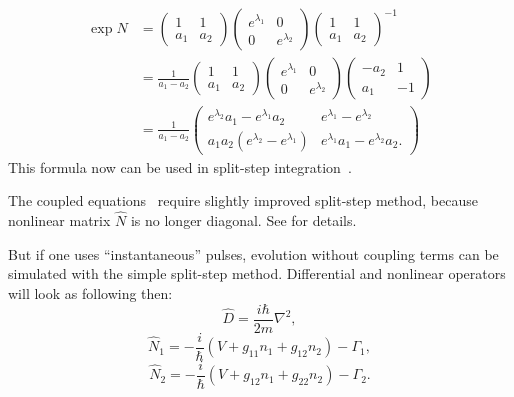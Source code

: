 \begin{equation}
\begin{split}
    \exp \hat{N} & = \begin{pmatrix}
        1 & 1 \\ a_1 & a_2
    \end{pmatrix}
    \begin{pmatrix}
        e^{\lambda_1} & 0 \\ 0 & e^{\lambda_2}
    \end{pmatrix}
    \begin{pmatrix}
        1 & 1 \\ a_1 & a_2
    \end{pmatrix}^{-1} \\
    & = \frac{1}{a_1 - a_2}
    \begin{pmatrix}
        1 & 1 \\ a_1 & a_2
    \end{pmatrix}
    \begin{pmatrix}
        e^{\lambda_1} & 0 \\ 0 & e^{\lambda_2}
    \end{pmatrix}
    \begin{pmatrix}
        -a_2 & 1 \\ a_1 & -1
    \end{pmatrix} \\
    & = \frac{1}{a_1 - a_2}
    \begin{pmatrix}
        e^{\lambda_2} a_1 - e^{\lambda_1} a_2 &
        e^{\lambda_1} - e^{\lambda_2} \\
        a_1 a_2 (e^{\lambda_2} - e^{\lambda_1}) &
        e^{\lambda_1} a_1 - e^{\lambda_2} a_2.
    \end{pmatrix}
\end{split}
\end{equation}
This formula now can be used in split-step integration~.

The coupled equations~ require slightly improved split-step method, because nonlinear matrix $\hat{N}$ is no longer diagonal.
See  for details.

But if one uses ``instantaneous'' pulses, evolution without coupling terms can be simulated with the simple split-step method.
Differential and nonlinear operators will look as following then:
\[
    \hat{D} = \frac{i \hbar}{2m} \nabla^2,
\]
\[
    \hat{N}_1 = -\frac{i}{\hbar} \left( V + g_{11} n_1 + g_{12} n_2 \right) - \Gamma_1,
\]
\[
    \hat{N}_2 = -\frac{i}{\hbar} \left( V + g_{12} n_1 + g_{22} n_2 \right) - \Gamma_2.
\]


